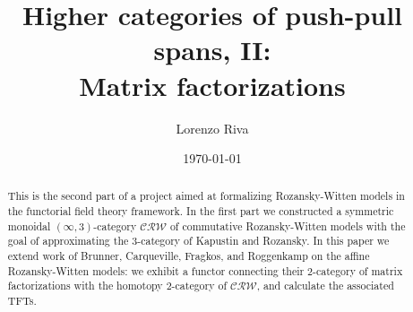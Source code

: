 \documentclass{amsart}
\title[Higher categories of push-pull spans, II]{Higher categories of push-pull spans, II:\\Matrix factorizations}
\date{\today}
\author{Lorenzo Riva}
\theoremstyle{definition}
\theoremstyle{theorem}
\theoremstyle{theorem}
\numberwithin{equation}{subsection}
\newcommand{\ms}[1]{\mathscr{#1}}
\newcommand{\sCRW}{\ms{CRW}}
\begin{document}
\maketitle

\begin{abstract}
	This is the second part of a project aimed at formalizing Rozansky-Witten models in the functorial field theory framework. In the first part we constructed a symmetric monoidal $(\infty, 3)$-category $\sCRW$ of commutative Rozansky-Witten models with the goal of approximating the $3$-category of Kapustin and Rozansky. In this paper we extend work of Brunner, Carqueville, Fragkos, and Roggenkamp on the affine Rozansky-Witten models: we exhibit a functor connecting their $2$-category of matrix factorizations with the homotopy $2$-category of $\sCRW$, and calculate the associated TFTs.
\end{abstract}

\setcounter{tocdepth}{2}
\tableofcontents

\end{document}
